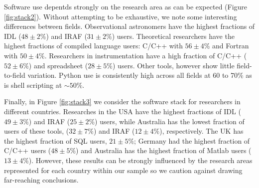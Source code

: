 Software use depentds strongly on the research area as can be expected (Figure \ref{fig:stack2}). Without attempting to be exhaustive, we note some interesting differences between fields. Observational astronomers have the highest fractions of IDL ($48\pm2\%$) and IRAF ($31\pm2\%$) users. Theoretical researchers have the highest fractions of compiled language users: C/C++ with $56\pm4\%$ and Fortran with $50\pm4\%$. Researchers in instrumentation have a high fraction of C/C++ ($52\pm6\%$) and spreadsheet ($28\pm5\%$) users. Other tools, however show little field-to-field variation. Python use is consistently high across all fields at 60 to 70\% as is shell scripting at $\sim50\%$. 

Finally, in Figure \ref{fig:stack3} we consider the software stack for researchers in different countries. Researches in the USA have the highest fractions of IDL ($49\pm3\%$) and IRAF ($25\pm2\%$) users, while Australia has the lowest fraction of users of these tools, ($32\pm7\%$) and IRAF ($12\pm4\%$), respectively. The UK has the highest fraction of SQL users, $21\pm5\%$; Germany had the highest fraction of C/C++ users ($48\pm5\%$) and Australia has the highest fraction of Matlab users ($13\pm4\%$). However, these results can be strongly influenced by the research areas represented for each country within our sample so we caution against drawing far-reaching conclusions.
